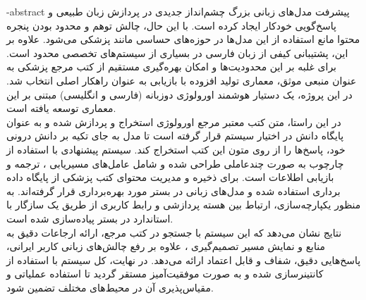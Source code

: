 \fa-abstract{
	پیشرفت مدل‌های زبانی بزرگ  چشم‌انداز جدیدی در پردازش زبان طبیعی و پاسخ‌گویی خودکار ایجاد کرده است. با این حال، چالش توهم  و محدود بودن پنجره محتوا  مانع استفاده از این مدل‌ها در حوزه‌های حساسی مانند پزشکی می‌شود. علاوه بر این، پشتیبانی کیفی از زبان فارسی در بسیاری از سیستم‌های تخصصی محدود است. برای غلبه بر این محدودیت‌ها و امکان بهره‌گیری مستقیم از کتب مرجع پزشکی به عنوان منبعی موثق، معماری تولید افزوده با بازیابی  به عنوان راهکار اصلی انتخاب شد. در این پروژه، یک دستیار هوشمند اورولوژی دوزبانه (فارسی و انگلیسی) مبتنی بر این معماری توسعه یافته است.\\
	در این راستا، متن کتب معتبر مرجع اورولوژی استخراج و پردازش شده و به عنوان پایگاه دانش در اختیار سیستم قرار گرفته است تا مدل به جای تکیه بر دانش درونی خود، پاسخ‌ها را از روی متون این کتب استخراج کند. سیستم پیشنهادی با استفاده از چارچوب  به صورت چندعاملی  طراحی شده و شامل عامل‌های مسیریابی ، ترجمه و بازیابی اطلاعات است. برای ذخیره و مدیریت محتوای کتب پزشکی از پایگاه داده برداری  استفاده شده و مدل‌های زبانی در بستر  مورد بهره‌برداری قرار گرفته‌اند. به منظور یکپارچه‌سازی، ارتباط بین هسته پردازشی و رابط کاربری  از طریق یک  سازگار با استاندارد  در بستر  پیاده‌سازی شده است.\\
	نتایج نشان می‌دهد که این سیستم با جستجو در کتب مرجع، ارائه ارجاعات دقیق به منابع  و نمایش مسیر تصمیم‌گیری ، علاوه بر رفع چالش‌های زبانی کاربر ایرانی، پاسخ‌هایی دقیق، شفاف و قابل اعتماد ارائه می‌دهد. در نهایت، کل سیستم با استفاده از  کانتینرسازی شده و به صورت موفقیت‌آمیز مستقر  گردید تا استفاده عملیاتی و مقیاس‌پذیری آن در محیط‌های مختلف تضمین شود.
}
\abstractPage
\newpage\clearpage
